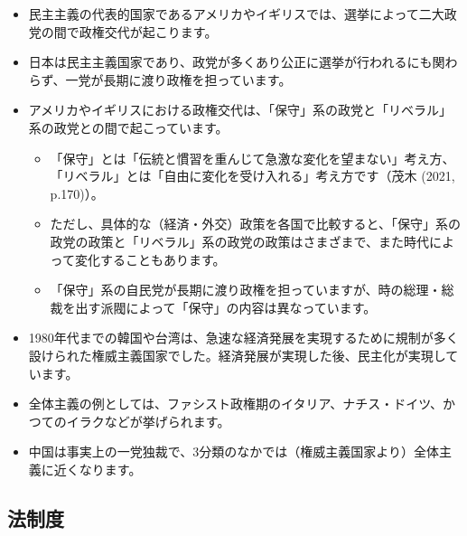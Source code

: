\documentclass[
]{book}
\begin{document}
\begin{itemize}
\item
  民主主義の代表的国家であるアメリカやイギリスでは、選挙によって二大政党の間で政権交代が起こります。
\item
  日本は民主主義国家であり、政党が多くあり公正に選挙が行われるにも関わらず、一党が長期に渡り政権を担っています。
\item
  アメリカやイギリスにおける政権交代は、「保守」系の政党と「リベラル」系の政党との間で起こっています。

  \begin{itemize}
  \item
    「保守」とは「伝統と慣習を重んじて急激な変化を望まない」考え方、「リベラル」とは「自由に変化を受け入れる」考え方です（茂木 (2021, p.170)）。
  \item
    ただし、具体的な（経済・外交）政策を各国で比較すると、「保守」系の政党の政策と「リベラル」系の政党の政策はさまざまで、また時代によって変化することもあります。
  \item
    「保守」系の自民党が長期に渡り政権を担っていますが、時の総理・総裁を出す派閥によって「保守」の内容は異なっています。
  \end{itemize}
\item
  1980年代までの韓国や台湾は、急速な経済発展を実現するために規制が多く設けられた権威主義国家でした。経済発展が実現した後、民主化が実現しています。
\item
  全体主義の例としては、ファシスト政権期のイタリア、ナチス・ドイツ、かつてのイラクなどが挙げられます。
\item
  中国は事実上の一党独裁で、3分類のなかでは（権威主義国家より）全体主義に近くなります。
\end{itemize}

\hypertarget{law}{%
\subsection{法制度}\label{law}}
\end{document}

